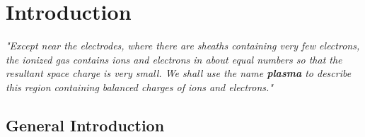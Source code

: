 \clearpage{\pagestyle{empty}\cleardoublepage}		%
\chapter{Introduction}
\setcounter{page}{1}
\label{intro:chap}

\begin{flushright}
\textit{"Except near the electrodes, where there are sheaths containing very few electrons, the ionized gas contains ions and electrons in about equal numbers so that the resultant space charge is very small. We shall use the name \textbf{plasma} to describe this region containing balanced charges of ions and electrons."}~\cite{langmuir1929tonks}
\end{flushright}
\vspace{1cm}
%
\section{General Introduction}
\label{intro:sec:backgroung}
